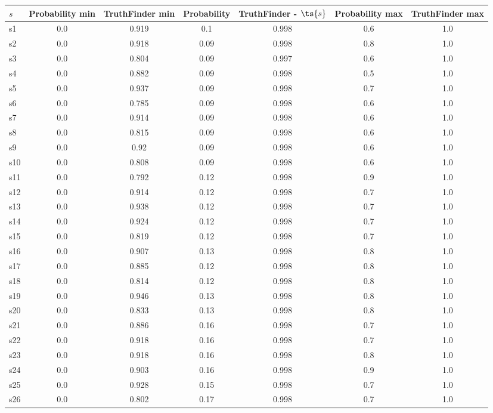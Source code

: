 \documentclass{article}
\begin{document}
\noindent\begin{tabular}{|l|c|c|c|c|c|c|}
\hline
$s$& Probability min & TruthFinder min & Probability & TruthFinder - $\ts{s}$ & Probability max & TruthFinder max\\
\hline
s1 &0.0 & 0.919 & 0.1 & 0.998 & 0.6 & 1.0\\
\hline
s2 &0.0 & 0.918 & 0.09 & 0.998 & 0.8 & 1.0\\
\hline
s3 &0.0 & 0.804 & 0.09 & 0.997 & 0.6 & 1.0\\
\hline
s4 &0.0 & 0.882 & 0.09 & 0.998 & 0.5 & 1.0\\
\hline
s5 &0.0 & 0.937 & 0.09 & 0.998 & 0.7 & 1.0\\
\hline
s6 &0.0 & 0.785 & 0.09 & 0.998 & 0.6 & 1.0\\
\hline
s7 &0.0 & 0.914 & 0.09 & 0.998 & 0.6 & 1.0\\
\hline
s8 &0.0 & 0.815 & 0.09 & 0.998 & 0.6 & 1.0\\
\hline
s9 &0.0 & 0.92 & 0.09 & 0.998 & 0.6 & 1.0\\
\hline
s10 &0.0 & 0.808 & 0.09 & 0.998 & 0.6 & 1.0\\
\hline
s11 &0.0 & 0.792 & 0.12 & 0.998 & 0.9 & 1.0\\
\hline
s12 &0.0 & 0.914 & 0.12 & 0.998 & 0.7 & 1.0\\
\hline
s13 &0.0 & 0.938 & 0.12 & 0.998 & 0.7 & 1.0\\
\hline
s14 &0.0 & 0.924 & 0.12 & 0.998 & 0.7 & 1.0\\
\hline
s15 &0.0 & 0.819 & 0.12 & 0.998 & 0.7 & 1.0\\
\hline
s16 &0.0 & 0.907 & 0.13 & 0.998 & 0.8 & 1.0\\
\hline
s17 &0.0 & 0.885 & 0.12 & 0.998 & 0.8 & 1.0\\
\hline
s18 &0.0 & 0.814 & 0.12 & 0.998 & 0.8 & 1.0\\
\hline
s19 &0.0 & 0.946 & 0.13 & 0.998 & 0.8 & 1.0\\
\hline
s20 &0.0 & 0.833 & 0.13 & 0.998 & 0.8 & 1.0\\
\hline
s21 &0.0 & 0.886 & 0.16 & 0.998 & 0.7 & 1.0\\
\hline
s22 &0.0 & 0.918 & 0.16 & 0.998 & 0.7 & 1.0\\
\hline
s23 &0.0 & 0.918 & 0.16 & 0.998 & 0.8 & 1.0\\
\hline
s24 &0.0 & 0.903 & 0.16 & 0.998 & 0.9 & 1.0\\
\hline
s25 &0.0 & 0.928 & 0.15 & 0.998 & 0.7 & 1.0\\
\hline
s26 &0.0 & 0.802 & 0.17 & 0.998 & 0.7 & 1.0\\

\end{tabular}
\end{document}
